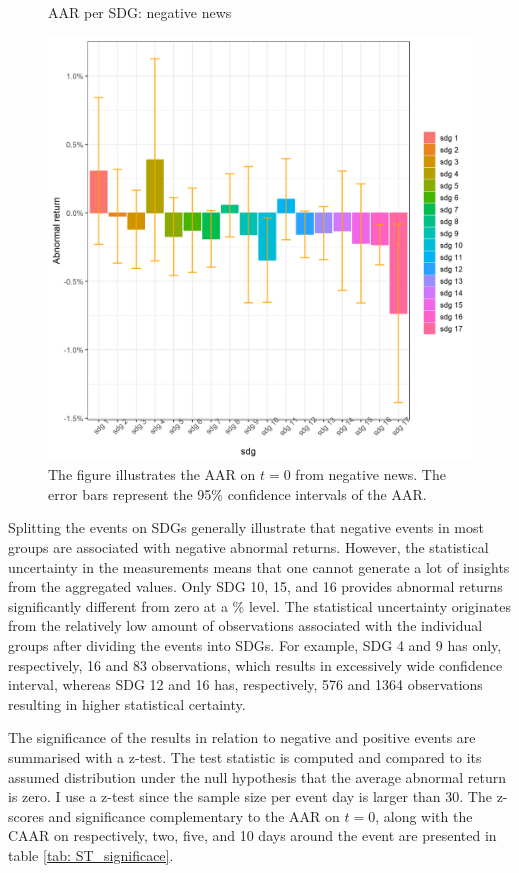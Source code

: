 \begin{figure} [H]
    \centering
    \caption{AAR per SDG: negative news}
    \includegraphics[scale=0.6]{Projekt/1.Figures analysis/ST_negative_sdg_bar.png}
    \caption*{\footnotesize The figure illustrates the AAR on $t = 0$ from negative news. The error bars represent the 95\% confidence intervals of the AAR.}
    \label{fig:ST_neg_bar}
\end{figure}

Splitting the events on SDGs generally illustrate that negative events in most groups are associated with negative abnormal returns. However, the statistical uncertainty in the measurements means that one cannot generate a lot of insights from the aggregated values. Only SDG 10, 15, and 16 provides abnormal returns significantly different from zero at a \% level. The statistical uncertainty originates from the relatively low amount of observations associated with the individual groups after dividing the events into SDGs. For example, SDG 4 and 9 has only, respectively, 16 and 83 observations, which results in excessively wide confidence interval, whereas SDG 12 and 16 has, respectively, 576 and 1364 observations resulting in higher statistical certainty.   

The significance of the results in relation to negative and positive events are summarised with a z-test. The test statistic is computed and compared to its assumed distribution under the null hypothesis that the average abnormal return is zero. I use a z-test since the sample size per event day is larger than 30. The z-scores and significance complementary to the AAR on $t=0$, along with the CAAR on respectively, two, five, and 10 days around the event are presented in table \ref{tab: ST_significace}.   


